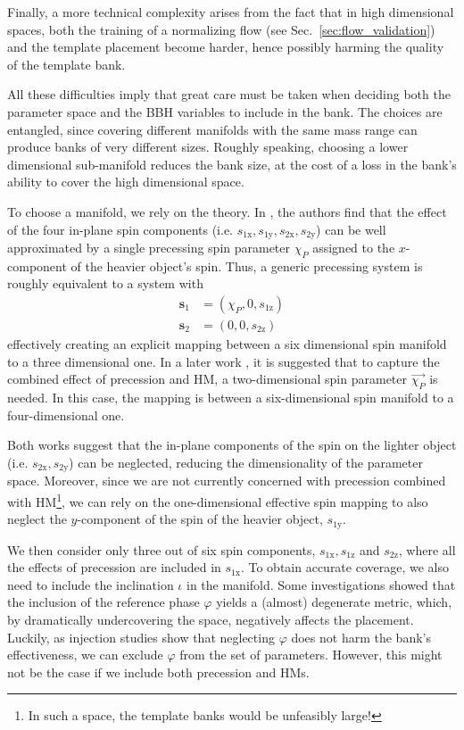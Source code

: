 \documentclass[twocolumn,showpacs,preprintnumbers,nofootinbib,prd,
superscriptaddress,10pt]{revtex4-2}
\begin{document}
Finally, a more technical complexity arises from the fact that in high dimensional spaces, both the training of a normalizing flow (see Sec.~\ref{sec:flow_validation}) and the template placement become harder, hence possibly harming the quality of the template bank.

All these difficulties imply that great care must be taken when deciding both the parameter space and the BBH variables to include in the bank.
The choices are entangled, since covering different manifolds with the same mass range can produce banks of very different sizes.
Roughly speaking, choosing a lower dimensional sub-manifold reduces the bank size, at the cost of a loss in the bank's ability to cover the high dimensional space.

To choose a manifold, we rely on the theory. In \cite{Schmidt:2014iyl}, the authors find that the effect of the four in-plane spin components (i.e. $s_\text{1x}, s_\text{1y}, s_\text{2x}, s_\text{2y}$) can be well approximated by a single precessing spin parameter $\chi_P$ assigned to the $x$-component of the heavier object's spin.
Thus, a generic precessing system is roughly equivalent to a system with
\begin{align*}
	\mathbf{s}_\text{1} &= (\chi_P, 0, s_\text{1z}) \\
	\mathbf{s}_\text{2} &= (0, 0, s_\text{2z})
\end{align*}
effectively creating an explicit mapping between a six dimensional spin manifold to a three dimensional one.
In a later work \cite{Thomas:2020uqj}, it is suggested that to capture the combined effect of precession and HM, a two-dimensional spin parameter $\vec{\chi_P}$ is needed. In this case, the mapping is between  a six-dimensional spin manifold to a four-dimensional one.

Both works suggest that the in-plane components of the spin on the lighter object (i.e. $s_\text{2x}, s_\text{2y}$) can be neglected, reducing the dimensionality of the parameter space.
Moreover, since we are not currently concerned with precession combined with HM\footnote{In such a space, the template banks would be unfeasibly large!}, we can rely on the one-dimensional effective spin mapping \cite{Schmidt:2014iyl} to also neglect the $y$-component of the spin of the heavier object, $s_\text{1y}$.

We then consider only three out of six spin components, $s_\text{1x}, s_\text{1z}$ and $s_\text{2z}$, where all the effects of precession are included in $s_\text{1x}$. To obtain accurate coverage, we also need to include the inclination $\iota$ in the manifold.
Some investigations showed that the inclusion of the reference phase $\varphi$ yields a (almost) degenerate metric, which, by dramatically undercovering the space, negatively affects the placement.
Luckily, as injection studies show that neglecting $\varphi$ does not harm the bank's effectiveness, we can exclude $\varphi$ from the set of parameters. However, this might not be the case if we include both precession and HMs.
\end{document}
